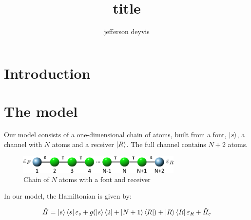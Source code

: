 \documentclass{comjnl}
\begin{document}
\title[title]{title}
\author{jefferson deyvis}
 

 




\begin{abstract}

\blindtext

\end{abstract}

\maketitle

\section{Introduction}

\blindtext

\section{The model} \label{Model}

\noindent Our model consists of a one-dimensional chain of atoms, built from a font, $\ket{s}$, a channel with $N$ atoms and a receiver $\ket{R}$. The full channel contains $N+2$ atoms.
\begin{figure}[ht]
  \centering
  \includegraphics[width= 22em]{fonte.png}
  \caption{Chain of $N$ atoms with a font and receiver}
\end{figure}

\noindent In our model, the Hamiltonian is given by:


\begin{equation}
    \hat{H} = \ket{s}\bra{s}\varepsilon_s + g(\ket{s}\bra{2} + \ket{N+1}\bra{R})+ \ket{R}\bra{R}\varepsilon_R + \hat{H}_c
\end{equation}
\end{document}

